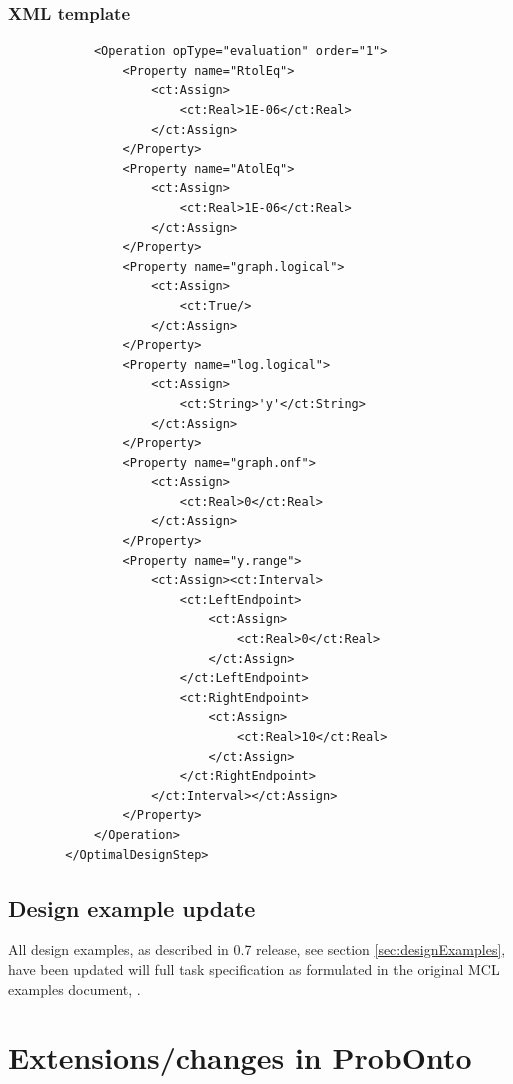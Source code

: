 \subsubsection{XML template}
\lstset{language=XML}
\begin{lstlisting}
            <Operation opType="evaluation" order="1">
                <Property name="RtolEq">
                    <ct:Assign>
                        <ct:Real>1E-06</ct:Real>
                    </ct:Assign>
                </Property>
                <Property name="AtolEq">
                    <ct:Assign>
                        <ct:Real>1E-06</ct:Real>
                    </ct:Assign>
                </Property>
                <Property name="graph.logical">
                    <ct:Assign>
                        <ct:True/>
                    </ct:Assign>
                </Property>
                <Property name="log.logical">
                    <ct:Assign>
                        <ct:String>'y'</ct:String>
                    </ct:Assign>
                </Property>
                <Property name="graph.onf">
                    <ct:Assign>
                        <ct:Real>0</ct:Real>
                    </ct:Assign>
                </Property>
                <Property name="y.range">
                    <ct:Assign><ct:Interval>
                        <ct:LeftEndpoint>
                            <ct:Assign>
                                <ct:Real>0</ct:Real>
                            </ct:Assign>
                        </ct:LeftEndpoint>
                        <ct:RightEndpoint>
                            <ct:Assign>
                                <ct:Real>10</ct:Real>
                            </ct:Assign>
                        </ct:RightEndpoint>
                    </ct:Interval></ct:Assign>
                </Property>
            </Operation>
        </OptimalDesignStep>
\end{lstlisting}

\subsection{Design example update}
All design examples, as described in 0.7 release, see section \ref{sec:designExamples},
have been updated will full task specification as formulated in the original MCL examples
document, \cite{CommetsExamples2015}.



\section{Extensions/changes in ProbOnto}
\label{sec:POextentions}

